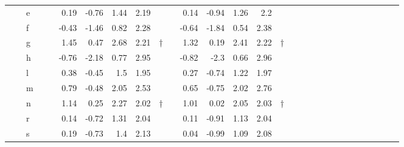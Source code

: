 \begin{sidewaystable}
{\begin{tabular}{lllp{2em}rrrrrcp{1em}rrrrcp{2em}rrrrrcp{1em}rrrrc}
        &                 & e           &&        &  0.19 &    -0.76 &    1.44   &    2.19     &        &&  0.14    &  -0.94    &   1.26    &    2.2  &       &&       &       &        &        &        &                        &&        &         &        &       &         \\
        &                 & f           &&        & -0.43 &    -1.46 &    0.82   &    2.28     &        && -0.64    &  -1.84    &   0.54    &   2.38  &       &&       &       &        &        &        &                        &&        &         &        &       &         \\
        &                 & g           &&        &  1.45 &     0.47 &    2.68   &    2.21     &   †    &&  1.32    &   0.19    &   2.41    &   2.22  &    †  &&       &       &        &        &        &                        &&        &         &        &       &         \\
        &                 & h           &&        & -0.76 &    -2.18 &    0.77   &    2.95     &        && -0.82    &   -2.3    &   0.66    &   2.96  &       &&       &       &        &        &        &                        &&        &         &        &       &         \\
        &                 & l           &&        &  0.38 &    -0.45 &     1.5   &    1.95     &        &&  0.27    &  -0.74    &   1.22    &   1.97  &       &&       &       &        &        &        &                        &&        &         &        &       &         \\
        &                 & m           &&        &  0.79 &    -0.48 &    2.05   &    2.53     &        &&  0.65    &  -0.75    &   2.02    &   2.76  &       &&       &       &        &        &        &                        &&        &         &        &       &         \\
        &                 & n           &&        &  1.14 &     0.25 &    2.27   &    2.02     &   †    &&  1.01    &   0.02    &   2.05    &   2.03  &    †  &&       &       &        &        &        &                        &&        &         &        &       &         \\
        &                 & r           &&        &  0.14 &    -0.72 &    1.31   &    2.04     &        &&  0.11    &  -0.91    &   1.13    &   2.04  &       &&       &       &        &        &        &                        &&        &         &        &       &         \\
        &                 & s           &&        &  0.19 &    -0.73 &     1.4   &    2.13     &        &&  0.04    &  -0.99    &   1.09    &   2.08  &       &&       &       &        &        &        &                        &&        &         &        &       &         \\

\end{tabular}}
\end{sidewaystable}
